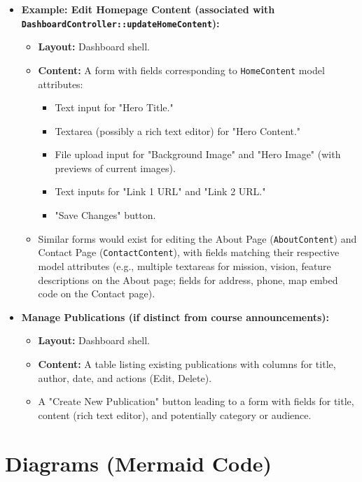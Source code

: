 \begin{itemize}
    \item \textbf{Example: Edit Homepage Content (associated with \texttt{DashboardController::updateHomeContent}):}
    \begin{itemize}
        \item \textbf{Layout:} Dashboard shell.
        \item \textbf{Content:} A form with fields corresponding to \texttt{HomeContent} model attributes:
        \begin{itemize}
            \item Text input for "Hero Title."
            \item Textarea (possibly a rich text editor) for "Hero Content."
            \item File upload input for "Background Image" and "Hero Image" (with previews of current images).
            \item Text inputs for "Link 1 URL" and "Link 2 URL."
            \item "Save Changes" button.
        \end{itemize}
        \item Similar forms would exist for editing the About Page (\texttt{AboutContent}) and Contact Page (\texttt{ContactContent}), with fields matching their respective model attributes (e.g., multiple textareas for mission, vision, feature descriptions on the About page; fields for address, phone, map embed code on the Contact page).
    \end{itemize}
    \item \textbf{Manage Publications (if distinct from course announcements):}
    \begin{itemize}
        \item \textbf{Layout:} Dashboard shell.
        \item \textbf{Content:} A table listing existing publications with columns for title, author, date, and actions (Edit, Delete).
        \item A "Create New Publication" button leading to a form with fields for title, content (rich text editor), and potentially category or audience.
    \end{itemize}
\end{itemize}

\section*{Diagrams (Mermaid Code)}

